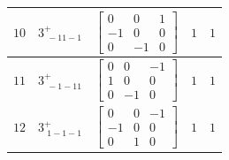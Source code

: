 \documentclass[fleqn,8pt]{jsarticle}
\begin{document}
\begin{longtable}{ccccc}
$ 10 $ & $ 3^{+}_{\,\,-11-1} $ & $ \begin{bmatrix} 0 & 0 & 1 \\ -1 & 0 & 0 \\ 0 & -1 & 0 \end{bmatrix} $ & $ 1 $ & $ 1 $ \\ \hline
$ 11 $ & $ 3^{+}_{\,\,-1-11} $ & $ \begin{bmatrix} 0 & 0 & -1 \\ 1 & 0 & 0 \\ 0 & -1 & 0 \end{bmatrix} $ & $ 1 $ & $ 1 $ \\ \hline
$ 12 $ & $ 3^{+}_{\,\,1-1-1} $ & $ \begin{bmatrix} 0 & 0 & -1 \\ -1 & 0 & 0 \\ 0 & 1 & 0 \end{bmatrix} $ & $ 1 $ & $ 1 $ \\
\end{longtable}
\end{document}
